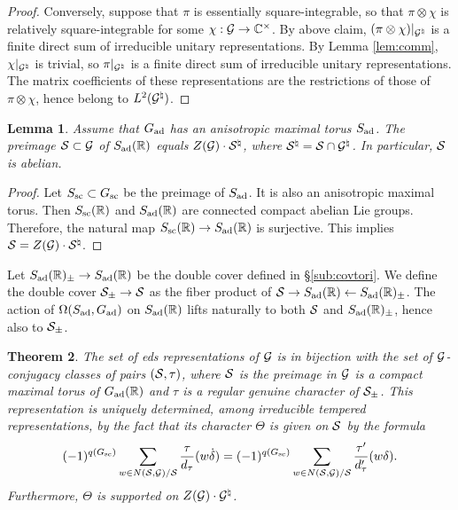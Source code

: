 \documentclass{article}
\newtheorem{thm}{Theorem}[subsection]
\newtheorem{lem}[thm]{Lemma}
\theoremstyle{definition}
\numberwithin{equation}{section}
\renewcommand{\-}{\hyp{}}
\begin{document}
\begin{proof}
Conversely, suppose that $\pi$ is essentially square-integrable, so that $\pi\otimes\chi$ is relatively square-integrable for some $\chi : \mathcal{G} \to \mathbb{C}^\times$. By above claim, $(\pi\otimes\chi)|_{\mathcal{G}^\natural}$ is a finite direct sum of irreducible unitary representations. By Lemma \ref{lem:comm}, $\chi|_{\mathcal{G}^\natural}$ is trivial, so $\pi|_{\mathcal{G}^\natural}$ is a finite direct sum of irreducible unitary representations. The matrix coefficients of these representations are the restrictions of those of $\pi\otimes\chi$, hence belong to $L^2(\mathcal{G}^\natural)$.
\end{proof}

\begin{lem} \label{lem:ani}
Assume that $G_{\textrm{ad}}$ has an anisotropic maximal torus $S_{\textrm{ad}}$. The preimage $\mathcal{S} \subset \mathcal{G}$ of $S_{\textrm{ad}}(\mathbb{R})$ equals $Z(\mathcal{G}) \cdot \mathcal{S}^\natural$, where $\mathcal{S}^\natural = \mathcal{S} \cap \mathcal{G}^\natural$. In particular, $\mathcal{S}$ is abelian.
\end{lem}
\begin{proof}
	Let $S_{\textrm{sc}} \subset G_{\textrm{sc}}$ be the preimage of $S_{\textrm{ad}}$. It is also an anisotropic maximal torus. Then $S_{\textrm{sc}}(\mathbb{R})$ and $S_{\textrm{ad}}(\mathbb{R})$ are connected compact abelian Lie groups. Therefore, the natural map $S_{\textrm{sc}}(\mathbb{R}) \to S_{\textrm{ad}}(\mathbb{R})$ is surjective. This implies $\mathcal{S} = Z(\mathcal{G}) \cdot \mathcal{S}^\natural$.
\end{proof}

Let $S_{\textrm{ad}}(\mathbb{R})_\pm \to S_{\textrm{ad}}(\mathbb{R})$ be the double cover defined in \S\ref{sub:covtori}. We define the double cover $\mathcal{S}_\pm \to \mathcal{S}$ as the fiber product of $\mathcal{S} \to S_{\textrm{ad}}(\mathbb{R}) \leftarrow S_{\textrm{ad}}(\mathbb{R})_\pm$. The action of $\Omega(S_{\textrm{ad}},G_{\textrm{ad}})$ on $S_{\textrm{ad}}(\mathbb{R})$ lifts naturally to both $\mathcal{S}$ and $S_{\textrm{ad}}(\mathbb{R})_\pm$, hence also to $\mathcal{S}_\pm$.



\begin{thm} \label{thm:eds}
The set of eds representations of $\mathcal{G}$ is in bijection with the set of $\mathcal{G}$-conjugacy classes of pairs $(\mathcal{S},\tau)$, where $\mathcal{S}$ is the preimage in $\mathcal{G}$ is a compact maximal torus of $G_{\textrm{ad}}(\mathbb{R})$ and $\tau$ is a regular genuine character of $\mathcal{S}_\pm$. This representation is uniquely determined, among irreducible tempered representations, by the fact that its character $\Theta$ is given on $\mathcal{S}$ by the formula
\begin{equation} \label{eq:charfmla}
		(-1)^{q(G_{\textrm{sc}})}\sum_{w \in N(\mathcal{S},\mathcal{G})/\mathcal{S}} \frac{\tau}{d_\tau}(w\dot\delta) = (-1)^{q(G_{\textrm{sc}})}\sum_{w \in N(\mathcal{S},\mathcal{G})/\mathcal{S}} \frac{\tau'}{d'_\tau}(w\delta).
\end{equation}
Furthermore, $\Theta$ is supported on $Z(\mathcal{G})\cdot \mathcal{G}^\natural$.
\end{thm}
\end{document}
